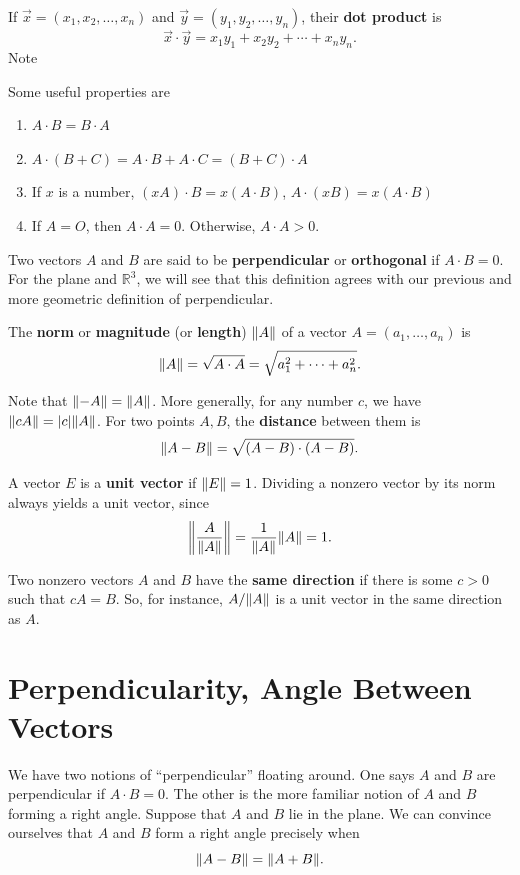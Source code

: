 \documentclass{article}
\begin{document}
If $\vec{x} = (x_1,x_2, \ldots, x_n)$ and $\vec{y} = (y_1, y_2, \ldots, y_n)$,
their \textbf{dot product} is 
\[\vec{x} \cdot \vec{y} = x_1 y_1 + x_2 y_2 + \cdots + x_n y_n.\]
Note 

Some useful properties are

\begin{enumerate}
    \item $A \cdot B = B \cdot A$
    \item $A \cdot (B + C) = A \cdot B + A \cdot C = (B+C) \cdot A$
    \item If $x$ is a number, $(xA) \cdot B = x(A \cdot B)$, $A \cdot (xB) = x(A \cdot B)$
    \item If $A=O$, then $A \cdot A = 0$. Otherwise, $A \cdot A > 0$.
\end{enumerate}

Two vectors $A$ and $B$ are said to be \textbf{perpendicular} or \textbf{orthogonal} if
$A \cdot B = 0$. For the plane and $\mathbb{R}^3$, we will see that this
definition agrees with our previous and more geometric definition of perpendicular.

The \textbf{norm} or \textbf{magnitude} (or \textbf{length}) $\norm{A}$ of a vector $A=(a_1, \ldots, a_n)$ is 
\[\norm{A} = \sqrt{A \cdot A} = \sqrt{a_1^2 + \cdots + a_n^2}.\]

Note that $\norm{-A} = \norm{A}$. More generally, for any number $c$, 
we have $\norm{cA} = |c|\norm{A}$. For two points $A,B$, the \textbf{distance}
between them is 
\[\norm{A-B}= \sqrt{(A-B)\cdot(A-B)}.\]

A vector $E$ is a \textbf{unit vector} if $\norm{E}=1$. Dividing a nonzero vector by its norm always yields
a unit vector, since 
\[\norm{\frac{A}{\norm{A}}} = \frac{1}{\norm{A}} \norm{A} = 1.\]

Two nonzero vectors $A$ and $B$ have the \textbf{same direction} if there is some $c>0$ such that
$cA = B$. So, for instance, $A/\norm{A}$ is a unit vector in the same direction as $A$.

\section*{Perpendicularity, Angle Between Vectors}

We have two notions of ``perpendicular'' floating around. One says $A$ and $B$ are perpendicular if $A \cdot B = 0$.
The other is the more familiar notion of $A$ and $B$ forming a right angle. Suppose that $A$ and $B$ lie in the plane.
We can convince ourselves that $A$ and $B$ form a right angle precisely when
\[\norm{A-B} = \norm{A+B}.\]
\end{document}
